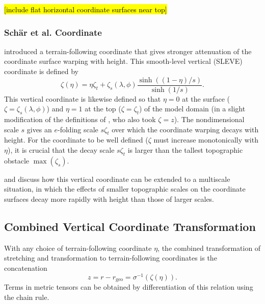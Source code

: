 \documentclass{report}
\begin{document}
\hl{[include flat horizontal coordinate surfaces near top]}

\subsubsection{Sch\"ar et al. Coordinate} \citet{Schar02a} introduced a terrain-following coordinate that gives stronger attenuation of the coordinate surface warping with height. This smooth-level vertical (SLEVE) coordinate is defined by
\begin{equation}\label{e:Schaer}
    \zeta(\eta) = \eta \zeta_t + \zeta_s(\lambda,\phi) \frac{\sinh\left((1-\eta)/s\right)}{\sinh(1/s)}.
\end{equation}
This vertical coordinate is likewise defined so that  $\eta = 0$ at the surface ($\zeta=\zeta_s(\lambda, \phi)$) and $\eta = 1$ at the top ($\zeta=\zeta_t$) of the model domain (in a slight modification of the definitions of \citet{Schar02a}, who also took $\zeta = z$). The nondimensional scale $s$ gives an $e$-folding scale $s \zeta_t$ over which the coordinate warping decays with height. For the coordinate to be well defined ($\zeta$ must increase monotonically with $\eta$), it is crucial that the decay scale $s \zeta_t$ is larger than the tallest topographic obstacle $\max(\zeta_s)$. 

\citet{Schar02a} and \citet{Leuenberger10q} discuss how this vertical coordinate can be extended to a multiscale situation, in which the effects of smaller topographic scales on the coordinate surfaces decay more rapidly with height than those of larger scales.  

\subsection{Combined Vertical Coordinate Transformation}

With any choice of terrain-following coordinate $\eta$, the combined transformation of stretching and transformation to terrain-following coordinates is the concatenation
\begin{equation}
    z = r - r_\mathrm{geo} = \sigma^{-1}\left(\zeta(\eta) \right).
\end{equation}
Terms in metric tensors can be obtained by differentiation of this relation using the chain rule. 
\end{document}
